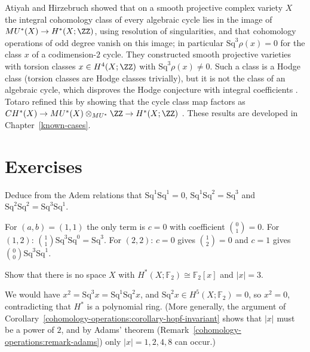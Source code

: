 \begin{remark}\label{cohomology-operations:remark-atiyah-hirzebruch}
Atiyah and Hirzebruch showed that on a smooth projective complex variety $X$ the integral cohomology class of every algebraic cycle lies in the image of $MU^*(X) \to H^*(X; \ZZ)$,
using resolution of singularities, and that cohomology operations of odd degree vanish on this image; in particular $\mathrm{Sq}^3\rho(x) = 0$ for the class $x$ of a codimension-$2$
cycle. They constructed smooth projective varieties with torsion classes $x \in H^4(X; \ZZ)$ with $\mathrm{Sq}^3\rho(x) \neq 0$. Such a class is a Hodge class (torsion classes are
Hodge classes trivially), but it is not the class of an algebraic cycle, which disproves the Hodge conjecture with integral coefficients \cite{atiyah-hirzebruch-1962}. Totaro
refined this by showing that the cycle class map factors as $CH^*(X) \to MU^*(X) \otimes_{MU^*} \ZZ \to H^*(X; \ZZ)$ \cite{totaro-1997}. These results are developed in
Chapter~\ref{known-cases}.
\end{remark}

\section{Exercises}\label{cohomology-operations:section-exercises}

\begin{exercise}\label{cohomology-operations:exercise-adem-small}
Deduce from the Adem relations that $\mathrm{Sq}^1\mathrm{Sq}^1 = 0$, $\mathrm{Sq}^1\mathrm{Sq}^2 = \mathrm{Sq}^3$ and $\mathrm{Sq}^2\mathrm{Sq}^2 = \mathrm{Sq}^3\mathrm{Sq}^1$.
\end{exercise}

\begin{solution}
For $(a, b) = (1, 1)$ the only term is $c = 0$ with coefficient $\binom{0}{1} = 0$. For $(1, 2)$: $\binom{1}{1}\mathrm{Sq}^3\mathrm{Sq}^0 = \mathrm{Sq}^3$. For $(2, 2)$: $c = 0$ gives $\binom{1}{2} = 0$ and
$c = 1$ gives $\binom{0}{0}\mathrm{Sq}^3\mathrm{Sq}^1$.
\end{solution}

\begin{exercise}\label{cohomology-operations:exercise-polynomial-degree-three}
Show that there is no space $X$ with $H^*(X; \mathbb{F}_2) \cong \mathbb{F}_2[x]$ and $|x| = 3$.
\end{exercise}

\begin{solution}
We would have $x^2 = \mathrm{Sq}^3x = \mathrm{Sq}^1\mathrm{Sq}^2x$, and $\mathrm{Sq}^2x \in H^5(X; \mathbb{F}_2) = 0$, so $x^2 = 0$, contradicting that $H^*$ is a polynomial ring. (More generally, the argument of Corollary~\ref{cohomology-operations:corollary-hopf-invariant} shows that
$|x|$ must be a power of $2$, and by Adams' theorem (Remark~\ref{cohomology-operations:remark-adams}) only $|x| = 1, 2, 4, 8$ can occur.)
\end{solution}


